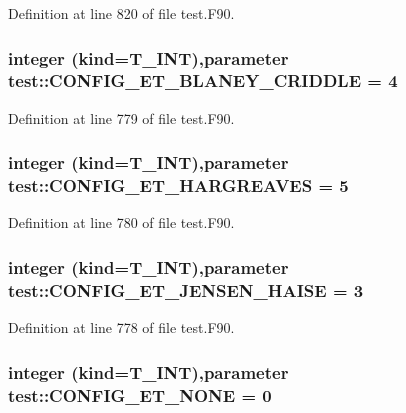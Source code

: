 Definition at line 820 of file test.F90.

\hypertarget{namespacetest_a30e48e6d5352a9d7b9f80946248ac7c7}{
\subsubsection[{CONFIG\_\-ET\_\-BLANEY\_\-CRIDDLE}]{\setlength{\rightskip}{0pt plus 5cm}integer (kind={\bf T\_\-INT}),parameter {\bf test::CONFIG\_\-ET\_\-BLANEY\_\-CRIDDLE} = 4}}
\label{namespacetest_a30e48e6d5352a9d7b9f80946248ac7c7}


Definition at line 779 of file test.F90.

\hypertarget{namespacetest_a7eb680c826f6ef864ae366e97076e482}{
\subsubsection[{CONFIG\_\-ET\_\-HARGREAVES}]{\setlength{\rightskip}{0pt plus 5cm}integer (kind={\bf T\_\-INT}),parameter {\bf test::CONFIG\_\-ET\_\-HARGREAVES} = 5}}
\label{namespacetest_a7eb680c826f6ef864ae366e97076e482}


Definition at line 780 of file test.F90.

\hypertarget{namespacetest_a2b90273702b4e7d130ec76d6e3eda6c7}{
\subsubsection[{CONFIG\_\-ET\_\-JENSEN\_\-HAISE}]{\setlength{\rightskip}{0pt plus 5cm}integer (kind={\bf T\_\-INT}),parameter {\bf test::CONFIG\_\-ET\_\-JENSEN\_\-HAISE} = 3}}
\label{namespacetest_a2b90273702b4e7d130ec76d6e3eda6c7}


Definition at line 778 of file test.F90.

\hypertarget{namespacetest_aeaf62d9982d23ab73d24f5367a32aaf7}{
\subsubsection[{CONFIG\_\-ET\_\-NONE}]{\setlength{\rightskip}{0pt plus 5cm}integer (kind={\bf T\_\-INT}),parameter {\bf test::CONFIG\_\-ET\_\-NONE} = 0}}
\label{namespacetest_aeaf62d9982d23ab73d24f5367a32aaf7}


